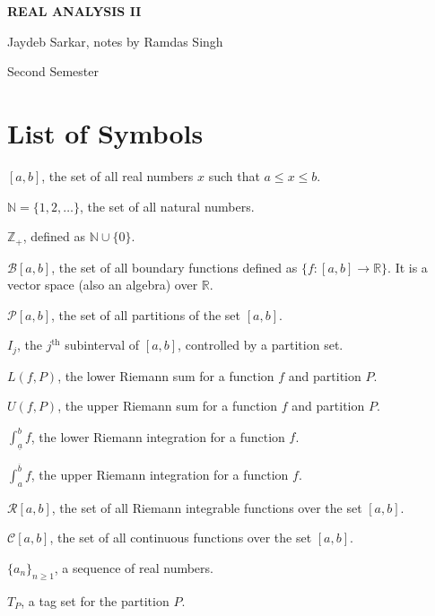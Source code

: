 \documentclass[15pt,a4paper]{book}
\theoremstyle{definition}
\newcommand{\cC}{\mathcal{C}}
\begin{document}
\pagestyle{empty}

\begin{titlepage}
    \begin{center}
    \vspace*{\fill}
    {\Huge \textbf{\MakeUppercase{Real Analysis II}}\par}

    \vspace{0.5cm} %
    {\Large Jaydeb Sarkar, notes by Ramdas Singh\par}

    \vspace{0.5cm} %
    {\large Second Semester\par}
    \vspace*{\fill}
    \end{center}
\end{titlepage}

\clearpage


\chapter*{List of Symbols}
\begin{notationlist}
    \item $[a,b]$, the set of all real numbers $x$ such that $a \leq x \leq b$.
    \item $\mathbb{N} = \{1,2,\ldots\}$, the set of all natural numbers.
    \item $\mathbb{Z}_{+}$, defined as $\mathbb{N} \cup \{0\}$.
    \item $\mathcal{B}[a,b]$, the set of all boundary functions defined as $\{f:[a,b] \to \mathbb{R}\}$. It is a vector space (also an algebra) over $\mathbb{R}$.
    \item $\mathcal{P}[a,b]$, the set of all partitions of the set $[a,b]$.
    \item $I_{j}$, the $j^{\text{th}}$ subinterval of $[a,b]$, controlled by a partition set.
    \item $L(f,P)$, the lower Riemann sum for a function $f$ and partition $P$.
    \item $U(f,P)$, the upper Riemann sum for a function $f$ and partition $P$.
    \item $\int_{\underline{a}}^{b} f$, the lower Riemann integration for a function $f$.
    \item $\int_{a}^{\overline{b}} f$, the upper Riemann integration for a function $f$.
    \item $\mathcal{R}[a,b]$, the set of all Riemann integrable functions over the set $[a,b]$.
    \item $\cC[a,b]$, the set of all continuous functions over the set $[a,b]$.
    \item $\{a_{n}\}_{n \geq 1}$, a sequence of real numbers.
    \item $T_{P}$, a tag set for the partition $P$.
\end{notationlist}
\end{document}

